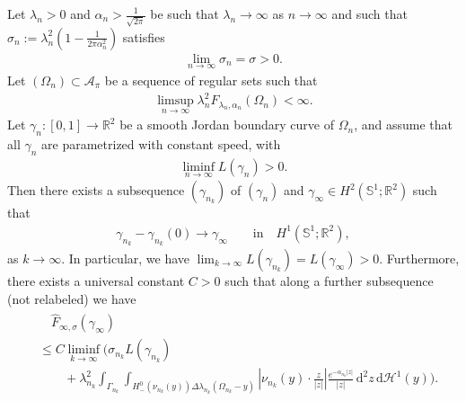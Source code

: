 \documentclass[10pt,a4paper]{amsart}
\newcommand{\Hd}{\mathcal H}				%
\newcommand{\R}{\mathbb R} 				%
\newcommand{\Sph}{{\mathbb S}}				%
\newcommand{\intd}{\, \mathrm{d}} 				%
\begin{document}
\begin{lemma}\label{lemma:compactness_single_curve}
  Let $\lambda_n > 0$ and $\alpha_n > \frac{1}{\sqrt{2\pi}}$ be
    such that $\lambda_n \to \infty$ as $n \to \infty$ and such that
  $\sigma_n := \lambda_n^2 \left( 1- \frac{1}{2\pi \alpha_n^2}
  \right)$ satisfies
  \begin{align}
    \label{eq:siglim}
          \lim_{n\to \infty} \sigma_n = \sigma >0.
	\end{align}
	Let $(\Omega_{n}) \subset \mathcal{A}_\pi$ be a sequence of
        regular sets such that
	\begin{align}\label{eq:compactness_boundedness}
		\limsup_{n \to \infty} \lambda_n^2 F_{\lambda_n,
          \alpha_n} (\Omega_n) <\infty. 
	\end{align}
        Let $\gamma_{n} :[0,1] \to \R^2$ be a smooth Jordan boundary
        curve of $\Omega_{n}$, and assume that all $\gamma_{n}$ are
        parametrized with constant speed, with
	\begin{align} \label{eq:liminfLn}
		 \liminf_{n \to \infty} L(\gamma_{n})>0.
	\end{align}
        Then there exists a subsequence $(\gamma_{n_k})$ of
          $(\gamma_n)$ and
        $\gamma_\infty \in H^2(\Sph^1; \R^2)$ such that
        \begin{align}
          \gamma_{n_k} - \gamma_{n_k}(0) \to \gamma_\infty
          \qquad 
          \text{in} \quad
          H^1(\Sph^1;\R^2),
        \end{align}
        as $k \to \infty$.  In particular, we have
        $\lim_{k \to \infty} L(\gamma_{n_k}) =
        L(\gamma_\infty) >0$.  Furthermore, there exists a universal
        constant $C>0$ such that
        along a further subsequence (not relabeled) we have
	\begin{align}\label{eq:up_to_constants}
	  \begin{split}
            &\quad  \hat F_{\infty,\sigma}(\gamma_\infty)\\
            & \leq C \liminf_{k \to \infty} \Bigg(
            \sigma_{n_k} L(\gamma_{n_k})\\
            & \qquad + \lambda_{n_k}^2 \int_{\Gamma_{n_k}} \int_{
              H^0_- (\nu_{n_k}(y)) \Delta
              \lambda_{n_k}(\Omega_{n_k} - y) } \left| \nu_{n_k}(y)
              \cdot \frac{ z}{|z|} \right|
            \frac{e^{-\alpha_{n_k}|z|}}{|z|} \intd^2 z \intd \Hd^1(y)
            \Bigg).
	  \end{split}
	  \end{align}
\end{lemma}
\end{document}
